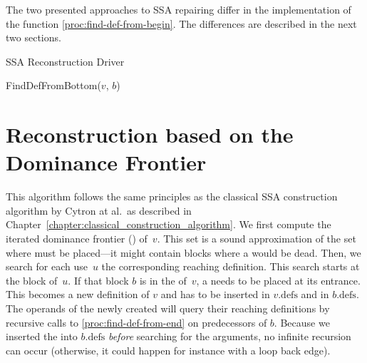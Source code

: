 {The two presented approaches to SSA repairing differ in the implementation of the function \ref{proc:find-def-from-begin}.
The differences are described in the next two sections.

\begin{algorithm}
	\caption{SSA Reconstruction Driver}
	\label{alg:ssaconstr_driver}

\end{algorithm}

\begin{procedure}
  \caption{FindDefFromBottom($v$, $b$)}
  \label{proc:find-def-from-end}
\end{procedure}

\section{Reconstruction based on the Dominance Frontier}
This algorithm follows the same principles as the classical SSA construction algorithm by Cytron at al.~as described in Chapter~\ref{chapter:classical_construction_algorithm}.
We first compute the iterated dominance frontier (\iDF) of~$v$.
This set is a sound approximation of the set where \phifuns must be placed---it might contain blocks where a \phifun would be dead.
Then, we search for each use~$u$ the corresponding reaching definition.
This search starts at the block of~$u$.
If that block $b$ is in the \iDF of~$v$, a \phifun needs to be placed at its entrance.
This \phifun becomes a new definition of $v$ and has to be inserted in $v.\textrm{defs}$ and in $b.\textrm{defs}$.
The operands of the newly created \phifun will query their reaching definitions by recursive calls to \ref{proc:find-def-from-end} on predecessors of $b$.
Because we inserted the \phifun into $b.\textrm{defs}$ \emph{before} searching for the arguments, no infinite recursion can occur (otherwise, it could happen for instance with a loop back edge).

}
